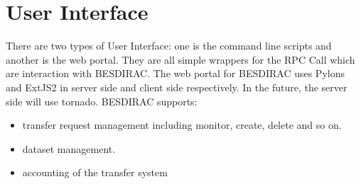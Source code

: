 \section{User Interface}
There are two types of User Interface: one is the command line scripts and 
another is the web portal. 
They are all simple wrappers for the RPC Call which are interaction
with BESDIRAC.
The web portal for BESDIRAC uses Pylons and ExtJS2 in server side and
client side respectively. In the future, the server side will use 
tornado. 
BESDIRAC supports:
\begin{itemize}
    \item transfer request management including monitor, create, delete
          and so on.
    \item dataset management.
    \item accounting of the transfer system
\end{itemize}
